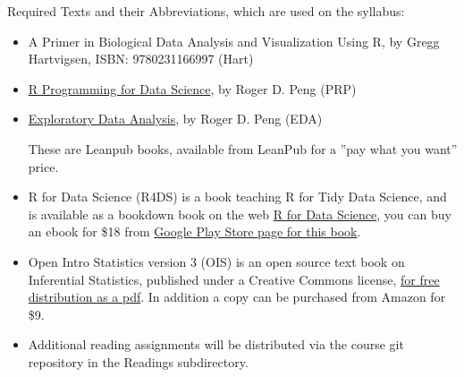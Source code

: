\documentclass[11pt]{article} %
\begin{document}
  Required Texts and their Abbreviations, which are used on the syllabus:
  \begin{itemize}
 
    \item A Primer in Biological Data Analysis and Visualization Using R, by Gregg Hartvigsen, ISBN: 9780231166997 (Hart)
  
    \item \href{https://leanpub.com/rprogramming}{R Programming for Data Science}, by Roger D. Peng (PRP)
  
    \item \href{https://leanpub.com/exdata}{Exploratory Data Analysis}, by Roger D. Peng (EDA) 
  
  These are  Leanpub books, available from LeanPub for a ”pay what you want” price. 
  
    \item R for Data Science (R4DS) is a book teaching R for Tidy Data Science, and is available as a bookdown book on the web \href{http://r4ds.had.co.nz/}{R for Data Science}, you can buy an ebook for \$18 from \href{https://play.google.com/store/books/details/Hadley_Wickham_R_for_Data_Science?id=I6y3DQAAQBAJ}{Google Play Store page for this book}. 
  
    \item Open Intro Statistics version 3 (OIS) is an open source text book on Inferential Statistics, published under a Creative Commons license, \href{https://drive.google.com/file/d/0B-DHaDEbiOGkc1RycUtIcUtIelE/view}{for free distribution as a pdf}. In addition a copy can be purchased from Amazon for \$9. 
  
    \item Additional reading assignments will be distributed via the course git repository in the Readings subdirectory. 
  \end{itemize}

\FloatBarrier
\end{document}
